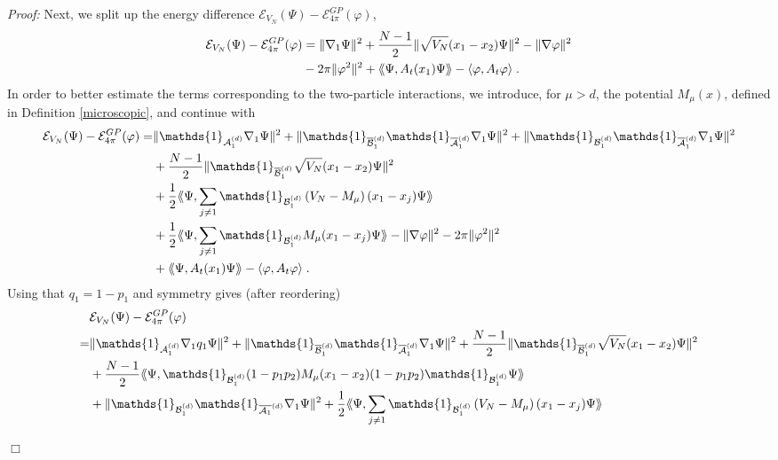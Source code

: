 \documentclass[11pt, english, american]{article}
\newcommand{\laa}{\langle\hspace{-0.08cm}\langle}
\newcommand{\raa}{\rangle\hspace{-0.08cm}\rangle}
\newenvironment{proof}{\emph{Proof:}}{\begin{flushright} $ \Box $ \end{flushright}}
\renewcommand{\phi}{\varphi}
\begin{document}
\begin{proof}
Next, we split up the energy difference $\mathcal{E}_{V_N}(\Psi)-\mathcal{E}_{4 \pi}^{GP}(\phi)$, 
\begin{align*}
\mathcal{E}_{V_N}(\Psi)-\mathcal{E}_{4 \pi}^{GP}(\phi)&=
%
\|\nabla_1\Psi \|^2+\frac{N-1}{2}\|\sqrt{V_N}(x_1-x_2)\Psi\|^2
-\|\nabla\phi \|^2
\\
&-2\pi\|\phi^2\|^2+
\laa \Psi, A_t (x_1) \Psi \raa - \langle \phi, A_t \phi \rangle
\;.
\end{align*}
In order to better estimate the terms corresponding to the two-particle interactions, we introduce, for $\mu>d$, the potential $M_{\mu} (x)$,
defined in Definition \ref{microscopic}, and continue with
\begin{align*}
\mathcal{E}_{V_N}(\Psi)-\mathcal{E}_{4 \pi}^{GP}(\phi)=&
\|\mathds{1}_{\mathcal{A}^{(d)}_{1}}\nabla_1\Psi\|^2
 +
  \|\mathds{1}_{\overline{\mathcal{B}}^{(d)}_{1}}
\mathds{1}_{\overline{\mathcal{A}}^{(d)}_{1}}
\nabla_1\Psi \|^2+
\|
\mathds{1}_{\mathcal{B}^{(d)}_{1}}
\mathds{1}_{\overline{\mathcal{A}}^{(d)}_{1}}
			\nabla_1\Psi \|^2 \nonumber\\&
%
%
+\frac{N-1}{2}\|\mathds{1}_{\overline{\mathcal{B}}^{(d)}_{1}}\sqrt{V_N}(x_1-x_2)\Psi \|^2
\\&+
\frac{1}{2}
\laa\Psi ,\sum_{j\neq
1}\mathds{1}_{\mathcal{B}^{(d)}_{1}}\left(V_N-M_{\mu}\right)(x_1-x_j)\Psi \raa
%
\\& +
\frac{1}{2}
\laa\Psi ,\sum_{j\neq
1}\mathds{1}_{\mathcal{B}^{(d)}_{1}}M_{\mu}(x_1-x_j)\Psi \raa
%
-\|\nabla\phi \|^2-2\pi\|\phi^2\|^2
\\&+\laa\Psi , A_t(x_1)\Psi\raa-\langle\phi , A_t\phi\rangle
\;.
%
\end{align*}
Using that $q_1=1-p_1$ and symmetry gives (after reordering)
\begin{align*} &
\mathcal{E}_{V_N}(\Psi)-\mathcal{E}_{4 \pi}^{GP}(\phi)
\\
=&
 \|\mathds{1}_{\mathcal{A}^{(d)}_{1}}\nabla_1q_1\Psi \|^2+
 \|\mathds{1}_{\overline{\mathcal{B}}^{(d)}_{1}}
\mathds{1}_{\overline{\mathcal{A}}^{(d)}_{1}}
\nabla_1\Psi \|^2
+
\frac{N-1}{2}\|\mathds{1}_{\overline{\mathcal{B}}^{(d)}_{1}}\sqrt{V_N}(x_1-x_2)\Psi \|^2
%
\\&
+\frac{N-1}{2}\laa\Psi ,\mathds{1}_{\mathcal{B}^{(d)}_{1}}(1-p_1p_2)M_{\mu}(x_1-x_2)(1-p_1p_2)\mathds{1}_{\mathcal{B}^{(d)}_{1}}\Psi\raa
%
\\&+ \|\mathds{1}_{\mathcal{B}^{(d)}_{1}}\mathds{1}_{\overline{\mathcal{A}_1}^{(d)}}\nabla_1\Psi \|^2
%
+
\frac{1}{2}
\laa\Psi ,\sum_{j\neq
1}\mathds{1}_{\mathcal{B}^{(d)}_{1}}\left(V_N-M_{\mu}\right)(x_1-x_j)\Psi \raa

\end{align*}
\end{proof}
\end{document}
